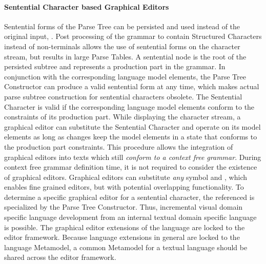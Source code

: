 \paragraph{Sentential Character based Graphical Editors}
Sentential forms of the Parse Tree can be persisted and used instead of the original input, \cite{iSW}. Post processing of the grammar to contain Structured Characters instead of non-terminals allows the use of sentential forms on the character stream, but results in large Parse Tables. A sentential node is the root of the persisted subtree and represents a production part in the grammar. In conjunction with the corresponding language model elements, the Parse Tree Constructor can produce a valid sentential form at any time, which makes actual parse subtree construction for sentential characters obsolete. The Sentential Character is valid if the corresponding language model elements conform to the constraints of its production part.  While displaying the character stream, a graphical editor can substitute the Sentential Character and operate on its model elements as long as changes keep the model elements in a state that conforms to the production part constraints. This procedure allows the integration of graphical editors into texts which still \emph{conform to a context free grammar}. During context free grammar definition time, it is not required to consider the existence of graphical editors. Graphical editors can substitute \emph{any} symbol and , which enables fine grained editors, but with potential overlapping functionality. To determine a specific graphical editor for a sentential character, the referenced  is specialized by the Parse Tree Constructor. Thus, incremental visual domain specific language development from an internal textual domain specific language is possible. The graphical editor extensions of the language are locked to the editor framework. Because language extensions in general are locked to the language Metamodel, a common Metamodel for a textual language should be shared across the editor framework.


